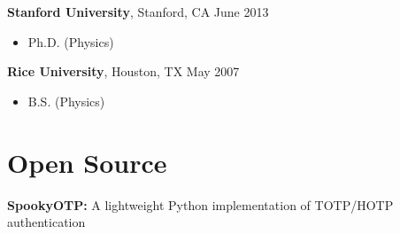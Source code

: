 \documentclass[margin,line]{resume}
\begin{document}
\begin{resume}
    \textbf{Stanford University}, Stanford, CA \hfill June 2013\vspace{-3mm}\\%
    \begin{itemize}
    \item Ph.D. (Physics)
    \end{itemize}\vspace{-1.5mm}

    \textbf{Rice University}, Houston, TX \hfill May 2007\vspace{-3mm}\\%
    \begin{itemize}
    \item B.S. (Physics)
    \end{itemize}%
    \section{\mysidestyle Open Source}%
    \textbf{SpookyOTP:} A lightweight Python implementation of TOTP/HOTP authentication\\%



\end{resume}
\end{document}
